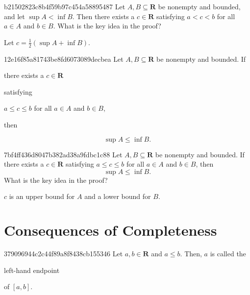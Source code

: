 \begin{note}{b21502823c8b4f59b97c454a58895487}
    Let \({ A, B \subseteq \mathbf{R} }\) be nonempty and bounded, and let \({ \sup A < \inf B }\).
    Then there exists a \({ c \in \mathbf{R} }\) satisfying \({ a < c < b }\) for all \({ a \in A }\) and \({ b \in B }\).
    What is the key idea in the proof?

    \begin{cloze}{1}
        Let \({ c = \frac{1}{2}(\sup A + \inf B) }\).
    \end{cloze}
\end{note}

\begin{note}{12e16f85a81743be8fd6073089decbea}
    Let \({ A, B \subseteq \mathbf{R} }\) be nonempty and bounded.
    If \begin{icloze}{3}there exists a \({ c \in \mathbf{R} }\)\end{icloze} satisfying \begin{icloze}{2}\({ a \leq c \leq b }\) for all \({ a \in A }\) and \({ b \in B }\),\end{icloze} then
    \begin{icloze}{1}
        \[
            \sup A \leq \inf B.
        \]
    \end{icloze}
\end{note}

\begin{note}{7bf4ff436d8047b382ad38a9fdbc1c88}
    Let \({ A, B \subseteq \mathbf{R} }\) be nonempty and bounded.
    If there exists a \({ c \in \mathbf{R} }\) satisfying \({ a \leq c \leq b }\) for all \({ a \in A }\) and \({ b \in B }\), then
    \[
        \sup A \leq \inf B.
    \]
    What is the key idea in the proof?

    \begin{cloze}{1}
        \({ c }\) is an upper bound for \({ A }\) and a lower bound for \({ B }\).
    \end{cloze}
\end{note}

\section{Consequences of Completeness}
\begin{note}{379096944c2c44f89a8f8438cb155346}
    Let \({ a, b \in \mathbf{R} }\) and \({ a \leqslant b }\).
    Then, \({ a }\) is called the \begin{icloze}{1}left-hand endpoint\end{icloze} of \({ [a, b] }\).
\end{note}

